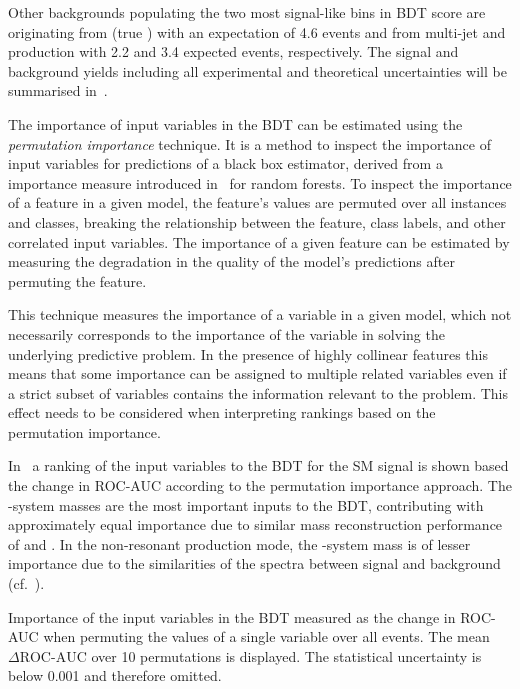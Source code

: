 Other backgrounds populating the two most signal-like bins in BDT
score are originating from \ttbar (true \tauhadvis) with an
expectation of 4.6 events and \jettotauhadvis from multi-jet and
\ttbar production with 2.2 and 3.4 expected events, respectively. The
signal and background yields including all experimental and
theoretical uncertainties will be summarised
in~.

The importance of input variables in the BDT can be estimated using
the \emph{permutation importance} technique. It is a method to inspect
the importance of input variables for predictions of a black box
estimator, derived from a importance measure introduced
in~\cite{breiman01} for random forests. To inspect the importance of a
feature in a given model, the feature's values are permuted over all
instances and classes, breaking the relationship between the feature,
class labels, and other correlated input variables. The importance of
a given feature can be estimated by measuring the degradation in the
quality of the model's predictions after permuting the feature.

This technique measures the importance of a variable in a given model,
which not necessarily corresponds to the importance of the variable in
solving the underlying predictive problem. In the presence of highly
collinear features this means that some importance can be assigned to
multiple related variables even if a strict subset of variables
contains the information relevant to the problem. This effect needs to
be considered when interpreting rankings based on the permutation
importance.

In~ a ranking of the input variables
to the BDT for the SM \HH signal is shown based the change in ROC-AUC
according to the permutation importance approach. The \PHiggs-system
masses are the most important inputs to the BDT, contributing with
approximately equal importance due to similar mass reconstruction
performance of \mMMC and \mBB. In the non-resonant production mode,
the \HH-system mass is of lesser importance due to the similarities of
the \mHH spectra between signal and background
(cf.~).

\begin{table}[htbp]
  \centering

  \caption{Importance of the input variables in the BDT measured as
    the change in ROC-AUC when permuting the values of a single
    variable over all events. The mean $\Delta\text{ROC-AUC}$ over 10
    permutations is displayed. The statistical uncertainty is below
    0.001 and therefore omitted.}%
  \label{tab:variable_importance_bdt}

  
\end{table}


